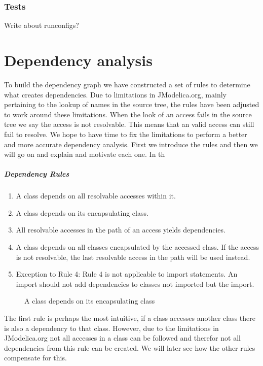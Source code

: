 \documentclass{cslthse-msc}
\begin{document}
\subsection{Tests}
    Write about runconfigs?

\chapter[Dependency analysis]{Dependency analysis}
To build the dependency graph we have constructed a set of rules to determine what creates dependencies. Due to limitations in JModelica.org, mainly pertaining to the lookup of names in the source tree, the rules have been adjusted to work around these limitations. When the look of an access fails in the source tree we say the access is not resolvable. This means that an valid access can still fail to resolve. We hope to have time to fix the limitations to perform a better and more accurate dependency analysis. First we introduce the rules and then we will go on and explain and motivate each one. In th

\paragraph{Dependency Rules}
\begin{enumerate}
\item A class depends on all resolvable accesses within it.
\item A class depends on its encapsulating class. 
\item All resolvable accesses in the path of an access yields dependencies.
\item A class depends on all classes encapsulated by the accessed class. If the access is not resolvable, the last resolvable access in the path will be used instead.
\item Exception to Rule 4: Rule 4 is not applicable to import statements. An import should not add dependencies to classes not imported but the import.
\end{enumerate}


\begin{figure}[!htbp]
    \centering
    \qquad
    \subfloat{\raisebox{3.2 cm}{}}
    \caption{A class depends on its encapsulating class}
    \label{fig:parentGraph}
\end{figure}

The first rule is perhaps the most intuitive, if a class accesses another class there is also a dependency to that class. However, due to the limitations in JModelica.org not all accesses in a class can be followed and therefor not all dependencies from this rule can be created. We will later see how the other rules compensate for this. 
\end{document}
